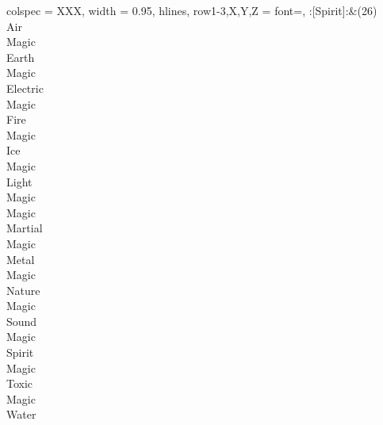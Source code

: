 \begin{longtblr}[
	caption = {2v1 Defending Resisted},
	label = {2v1-Defending-Resisted},
]{
	colspec = {XXX}, width = 0.95\linewidth,
	hlines,
	row{1-3,X,Y,Z} = {font=\bfseries},
}
	:[Spirit]:&{(26)\\
	Air \\
	Magic \\
	Earth \\
	Magic \\
	Electric \\
	Magic \\
	Fire \\
	Magic \\
	Ice \\
	Magic \\
	Light \\
	Magic \\
	Magic \\
	Martial \\
	Magic \\
	Metal \\
	Magic \\
	Nature \\
	Magic \\
	Sound \\
	Magic \\
	Spirit \\
	Magic \\
	Toxic \\
	Magic \\
	Water \\
	}\\

\end{longtblr}
\onecolumn
